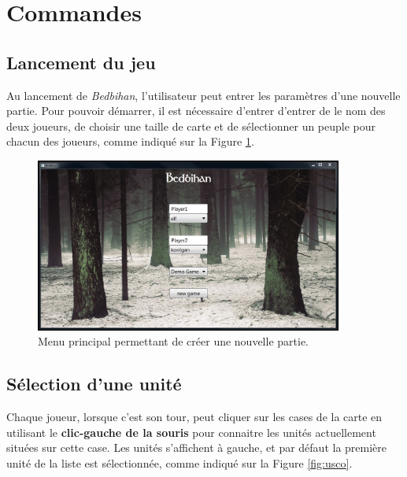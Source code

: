 \newpage
\section{Commandes}

		\subsection{Lancement du jeu}

		Au lancement de \emph{Bedbihan}, l'utilisateur peut entrer les paramètres d'une nouvelle partie. Pour pouvoir démarrer, il est nécessaire d'entrer d'entrer de le nom des deux joueurs, de choisir une taille de carte et de sélectionner un peuple pour chacun des joueurs, comme indiqué sur la {\sc Figure }{\ref {fig:launch}}.
		
		\begin{figure}[h!]
			\begin{center}
				\includegraphics[width=0.9\textwidth]{figure/mainmenu.png}
			\end{center}
			\caption{Menu principal permettant de créer une nouvelle partie.}
			\label{fig:launch}
		\end{figure}

		\subsection{Sélection d'une unité}
		Chaque joueur, lorsque c'est son tour, peut cliquer sur les cases de la carte en utilisant le {\bf clic-gauche de la souris} pour connaitre les unités actuellement situées sur cette case. Les unités s'affichent à gauche, et par défaut la première unité de la liste est sélectionnée, comme indiqué sur la {\sc Figure }{\ref {fig:usco}}. 
		
